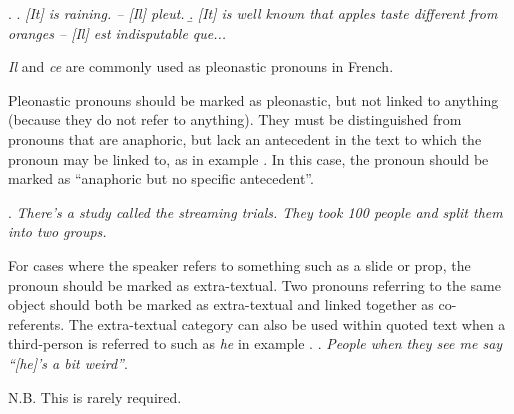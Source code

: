 \documentclass[a4paper]{article}
\begin{document}
\ex.
\a. {\sl [It] is raining. -- [Il] pleut.}
\b. {\sl [It] is well known that apples taste different from oranges --  [Il]
est indisputable que...}

\textsl{Il} and \textsl{ce} are commonly used as pleonastic pronouns in French.



Pleonastic pronouns should be marked as pleonastic, but not linked to anything
(because they do not refer to anything). They must be distinguished from
pronouns that are anaphoric, but lack an antecedent in the text to which the
pronoun may be linked to, as in example \Next. In this case, the pronoun should
be marked as ``anaphoric but no specific antecedent''.

\ex. {\sl There's a study called the streaming trials. {\sl They} took 100 people and split them into two groups.}

For cases where the speaker refers to something such as a slide or prop, the pronoun should be marked as extra-textual. Two pronouns referring to the same object should both be marked as extra-textual and linked together as co-referents.
The extra-textual category can also be used within quoted text when a third-person is referred to such as {\sl he} in example \Next.
\ex.
{\sl People when they see me say ``[he]'s a bit weird''}.

N.B. This is rarely required.


% 
% 
\end{document}
